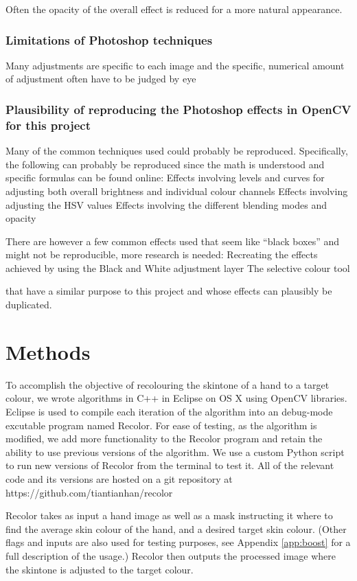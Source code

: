 \documentclass[12pt, a4paper]{article}
\begin{document}
Often the opacity of the overall effect is reduced for a more natural appearance.

\subsubsection{Limitations of Photoshop techniques}
Many adjustments are specific to each image and the specific, numerical amount of adjustment often have to be judged by eye

\subsubsection{Plausibility of reproducing the Photoshop effects in OpenCV for this project}
Many of the common techniques used could probably be reproduced. Specifically, the following can probably be reproduced since the math is understood and specific formulas can be found online: 
Effects involving levels and curves for adjusting both overall brightness and individual colour channels
Effects involving adjusting the HSV values
Effects involving the different blending modes and opacity 

There are however a few common effects used that seem like “black boxes” and might not be reproducible, more research is needed:
Recreating the effects achieved by using the Black and White adjustment layer
The selective colour tool

that have a similar purpose to this project and whose effects can plausibly be duplicated.

\pagebreak

\section{Methods}
To accomplish the objective of recolouring the skintone of a hand to a target colour, we wrote algorithms in C++ in Eclipse on OS X using OpenCV libraries. Eclipse is used to compile each iteration of the algorithm into an debug-mode excutable program named Recolor. For ease of testing, as the algorithm is modified, we add more functionality to the Recolor program and retain the ability to use previous versions of the algorithm. We use a custom Python script to run new versions of Recolor from the terminal to test it. All of the relevant code and its versions are hosted on a git repository at https://github.com/tiantianhan/recolor 

Recolor takes as input a hand image as well as a mask instructing it where to find the average skin colour of the hand, and a desired target skin colour. (Other flags and inputs are also used for testing purposes, see Appendix \ref{app:boost} for a full description of the usage.) Recolor then outputs the processed image where the skintone is adjusted to the target colour.
\end{document}
